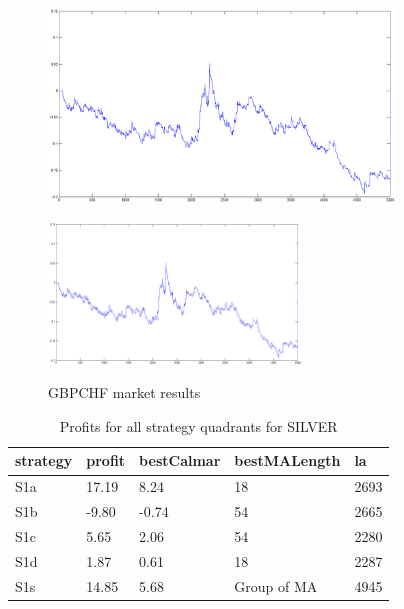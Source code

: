 \documentclass{tewiart}
\begin{document}
\begin{figure}[h]
\begin{minipage}{.49\linewidth}
\centering
\includegraphics[width=0.82\textwidth]{images/gbpchfD.eps}
\label{mansard}
\end{minipage}
\begin{minipage}{\linewidth}
\centering
\includegraphics[width=0.6\textwidth]{images/gbpchfS.eps}
\label{mansard}
\end{minipage}
\caption{GBPCHF market results}
\end{figure}
\FloatBarrier
\newpage
\begin{table}[!t]
\caption{Profits for all strategy quadrants for SILVER}
 \begin{center}
 \begin{tabular}{|l|l|l|l|l|}
 \hline \textbf{strategy} & \textbf{profit} & \textbf{bestCalmar} & \textbf{bestMALength} & \textbf{la} \\ \hline
S1a & 17.19 & 8.24 & 18 & 2693\\ \hline
S1b & -9.80 & -0.74 & 54 & 2665\\ \hline
S1c & 5.65 & 2.06 & 54 & 2280\\ \hline
S1d & 1.87 & 0.61 & 18 & 2287\\ \hline
S1s & 14.85 & 5.68 & Group of MA & 4945\\
\hline \end{tabular}
 \end{center}
 \end{table}
\end{document}
